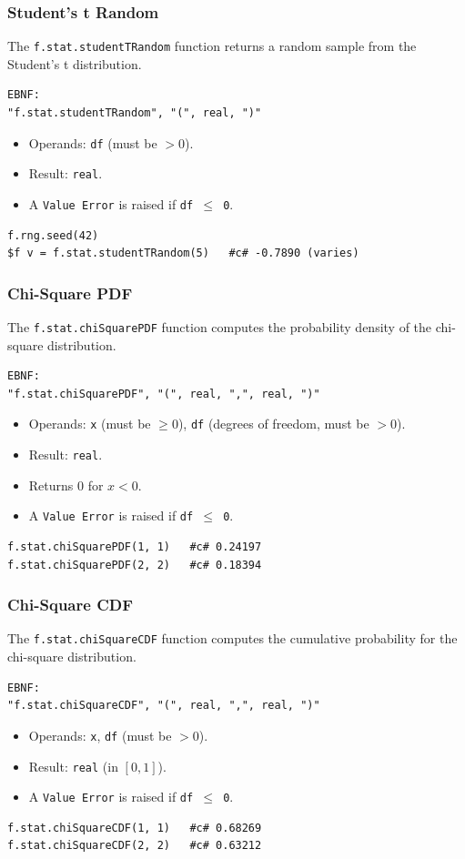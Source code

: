 \subsubsection{Student's t Random}
The \texttt{f.stat.studentTRandom} function returns a random sample from the Student's t distribution.
\begin{verbatim}
EBNF:
"f.stat.studentTRandom", "(", real, ")"
\end{verbatim}
\begin{itemize}
\item Operands: \texttt{df} (must be $> 0$).
\item Result: \texttt{real}.
\item A \texttt{Value Error} is raised if \texttt{df $\leq$ 0}.
\end{itemize}
\begin{verbatim}
f.rng.seed(42)
$f v = f.stat.studentTRandom(5)   #c# -0.7890 (varies)
\end{verbatim}

\subsubsection{Chi-Square PDF}
The \texttt{f.stat.chiSquarePDF} function computes the probability density of the chi-square distribution.
\begin{verbatim}
EBNF:
"f.stat.chiSquarePDF", "(", real, ",", real, ")"
\end{verbatim}
\begin{itemize}
\item Operands: \texttt{x} (must be $\geq 0$), \texttt{df} (degrees of freedom, must be $> 0$).
\item Result: \texttt{real}.
\item Returns 0 for $x < 0$.
\item A \texttt{Value Error} is raised if \texttt{df $\leq$ 0}.
\end{itemize}
\begin{verbatim}
f.stat.chiSquarePDF(1, 1)   #c# 0.24197
f.stat.chiSquarePDF(2, 2)   #c# 0.18394
\end{verbatim}

\subsubsection{Chi-Square CDF}
The \texttt{f.stat.chiSquareCDF} function computes the cumulative probability for the chi-square distribution.
\begin{verbatim}
EBNF:
"f.stat.chiSquareCDF", "(", real, ",", real, ")"
\end{verbatim}
\begin{itemize}
\item Operands: \texttt{x}, \texttt{df} (must be $> 0$).
\item Result: \texttt{real} (in $[0, 1]$).
\item A \texttt{Value Error} is raised if \texttt{df $\leq$ 0}.
\end{itemize}
\begin{verbatim}
f.stat.chiSquareCDF(1, 1)   #c# 0.68269
f.stat.chiSquareCDF(2, 2)   #c# 0.63212
\end{verbatim}

